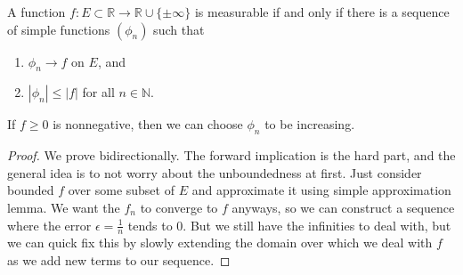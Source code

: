   \begin{theorem}
    A function $f: E \subset \mathbb{R} \to \mathbb{R} \cup \{ \pm \infty\}$ is measurable if and only if there is a sequence of simple functions $(\phi_n)$ such that 
    \begin{enumerate}
      \item $\phi_n \to f$ on $E$, and 
      \item $|\phi_n| \leq |f|$ for all $n \in \mathbb{N}$. 
    \end{enumerate}
    If $f \geq 0$ is nonnegative, then we can choose $\phi_n$ to be increasing. 
  \end{theorem}
  \begin{proof}
    We prove bidirectionally. The forward implication is the hard part, and the general idea is to not worry about the unboundedness at first. Just consider bounded $f$ over some subset of $E$ and approximate it using simple approximation lemma. We want the $f_n$ to converge to $f$ anyways, so we can construct a sequence where the error $\epsilon = \frac{1}{n}$ tends to $0$. But we still have the infinities to deal with, but we can quick fix this by slowly extending the domain over which we deal with $f$ as we add new terms to our sequence. 


\end{proof}
